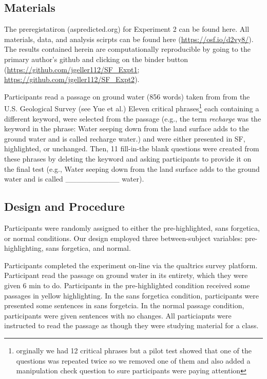 \documentclass[doc]{apa6}
\begin{document}
\hypertarget{materials-1}{%
\subsection{Materials}\label{materials-1}}

The preregistatiron (aspredicted.org) for Experiment 2 can be found here. All materials, data, and analysis scirpts can be found here (\url{https://osf.io/d2vy8/}). The results contained herein are computationally reproducible by going to the primary author's github and clicking on the binder button (\url{https://github.com/jgeller112/SF_Expt1}; \url{https://github.com/jgeller112/SF_Expt2}).

Participants read a passage on ground water (856 words) taken from from the U.S. Geological Survey (see Yue et al.) Eleven critical phrases\footnote{orginally we had 12 critical phrases but a pilot test showed that one of the questions was repeated twice so we removed one of them and also added a manipulation check question to sure participants were paying attention} each containing a different keyword, were selected from the passage (e.g., the term \emph{recharge} was the keyword in the phrase: Water seeping down from the land surface adds to the ground water and is called recharge water.) and were either presented in SF, highlighted, or unchanged. Then, 11 fill-in-the blank questions were created from these phrases by deleting the keyword and asking participants to provide it on the final test (e.g., Water seeping down from the land surface adds to the ground water and is called \_\_\_\_\_\_\_\_\_\_ water).

\hypertarget{design-and-procedure}{%
\subsection{Design and Procedure}\label{design-and-procedure}}

Participants were randomly assigned to either the pre-highlighted, sans forgetica, or normal conditions. Our design employed three between-subject variables: pre-highlighting, sans forgetica, and normal.

Participants completed the experiment on-line via the qualtrics survey platform. Participant read the passage on ground water in its entirety, which they were given 6 min to do. Participants in the pre-highlighted condition received some passages in yellow highlighting. In the sans forgetica condition, participants were presented some sentences in sans forgetcia. In the normal passage condition, participants were given sentences with no changes. All particiapnts were instructed to read the passage as though they were studying material for a class.
\end{document}
